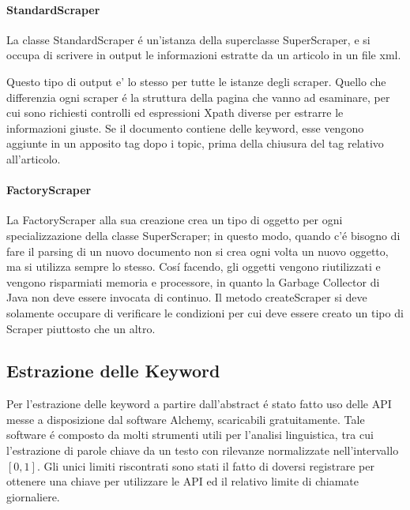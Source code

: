 \documentclass[11pt,a4paper]{article}
\begin{document}
\paragraph{StandardScraper}
\label{par:standardscraper}
La classe StandardScraper \'e un'istanza della superclasse SuperScraper, e si occupa di scrivere in output le informazioni estratte da un articolo in un file xml.


Questo tipo di output e' lo stesso per tutte le istanze degli scraper. Quello che differenzia ogni scraper \'e la struttura della pagina che vanno ad esaminare, per cui sono richiesti controlli ed espressioni Xpath diverse per estrarre le informazioni giuste. Se il documento contiene delle keyword, esse vengono aggiunte in un apposito tag dopo i topic, prima della chiusura del tag relativo all'articolo.



\paragraph{FactoryScraper}
\label{par:factoryscraper}



La FactoryScraper alla sua creazione crea un tipo di oggetto per ogni specializzazione della classe SuperScraper; in questo modo, quando c'\'e bisogno di fare il parsing di un nuovo documento non si crea ogni volta un nuovo oggetto, ma si utilizza sempre lo stesso. Cos\'i facendo, gli oggetti vengono riutilizzati e vengono risparmiati memoria e processore, in quanto la Garbage Collector di Java non deve essere invocata di continuo. Il metodo createScraper si deve solamente occupare di verificare le condizioni per cui deve essere creato un tipo di Scraper piuttosto che un altro.

\subsection{Estrazione delle Keyword}
Per l'estrazione delle keyword a partire dall'abstract \'e stato fatto uso delle API messe a disposizione dal software Alchemy\cite{alchemy}, scaricabili gratuitamente. Tale software \'e composto da molti strumenti utili per l'analisi linguistica, tra cui l'estrazione di parole chiave da un testo con rilevanze normalizzate nell'intervallo $[0,1]$. Gli unici limiti riscontrati sono stati il fatto di doversi registrare per ottenere una chiave per utilizzare le API ed il relativo limite di chiamate giornaliere.
\end{document}
